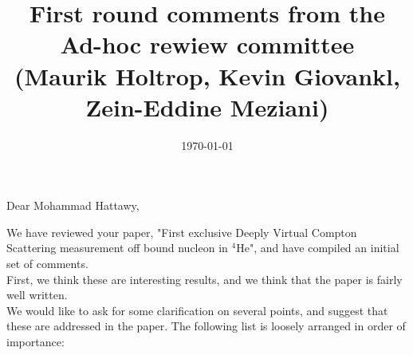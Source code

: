 \documentclass[a4paper,11pt,twoside]{article}
\title{First round comments from the Ad-hoc rewiew committee \\
 (Maurik Holtrop, Kevin Giovankl, Zein-Eddine Meziani)}
\date{\today}
\begin{document}
\maketitle

\section*{}

Dear Mohammad Hattawy,

We have reviewed your paper, "First exclusive Deeply Virtual Compton Scattering measurement off bound nucleon in $^4$He", and have compiled an initial set of comments.\\

First, we think these are interesting results, and we think that the paper is fairly well written.\\ 

We would like to ask for some clarification on several points, and suggest that these are addressed in the paper. The following list is loosely arranged in order of importance: \\
\end{document}
